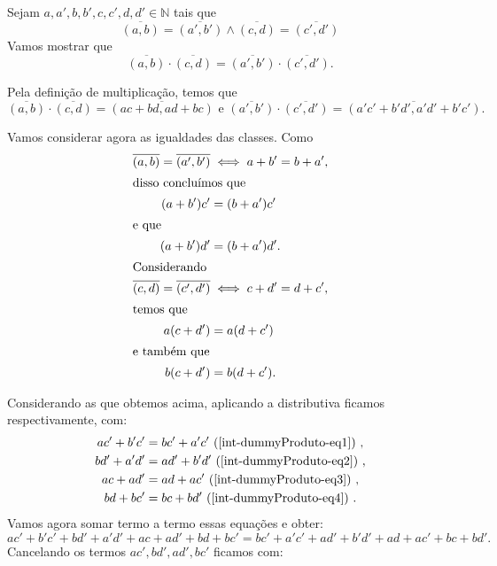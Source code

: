 \documentclass[../main.tex]{subfiles}
\begin{document}
\begin{dem}
    Sejam $a,a',b,b',c,c',d,d' \in \mathbb{N} $ tais que 
    \[ \overline{(a,b)} = \overline{(a',b')} \land \overline{(c,d)} = \overline{(c',d')}\]
    Vamos mostrar que
    \[ \overline{(a,b)} \cdot \overline{(c,d)} = \overline{(a',b')} \cdot \overline{(c',d')}. \]

    Pela definição de multiplicação, temos que 
    \[ \overline{(a,b)} \cdot \overline{(c,d)} = \overline{(ac+bd,ad+bc)} \text{ e } \overline{(a',b')} \cdot \overline{(c',d')} = \overline{(a'c'+b'd',a'd'+b'c')}.\]
    
    Vamos considerar agora as igualdades das classes. Como 
    \begin{align}
        \overline{(a,b)} = \overline{(a',b')} &\iff a + b' = b + a', \nonumber \\        \shortintertext{disso concluímos que}  
        (a + b')c' &= (b + a')c' \label{int-dummyProduto-eq1} \\         \shortintertext{e que} 
        (a + b')d' &= (b + a')d' . \label{int-dummyProduto-eq2} \\        \shortintertext{Considerando} 
        \overline{(c,d)} = \overline{(c',d')} &\iff c + d' = d + c', \nonumber \\        \shortintertext{temos que}  
        a(c + d') &= a(d + c') \label{int-dummyProduto-eq3} \\        \shortintertext{e também que}  
        b(c + d') &= b(d + c'). \label{int-dummyProduto-eq4}
    \end{align}
    
    Considerando as  que obtemos acima, aplicando a distributiva ficamos respectivamente, com:
    \begin{align*}
        ac'+b'c' &= bc'+a'c' \text{ (\Cref{int-dummyProduto-eq1}) }, \\
        bd'+a'd' &= ad'+b'd' \text{ (\Cref{int-dummyProduto-eq2}) },\\
        ac+ad'   &= ad+ac' \text{ (\Cref{int-dummyProduto-eq3}) },\\
        bd+bc'   &= bc+bd' \text{ (\Cref{int-dummyProduto-eq4}) }.
    \end{align*}
    Vamos agora somar termo a termo essas equações e obter:
    \[ ac'+b'c' + bd'+a'd' + ac+ad' + bd+bc' = bc'+a'c' + ad'+b'd' + ad+ac' + bc+bd'. \]
    Cancelando os termos $ac', bd', ad', bc'$ ficamos com:
    

\end{dem}
\end{document}
